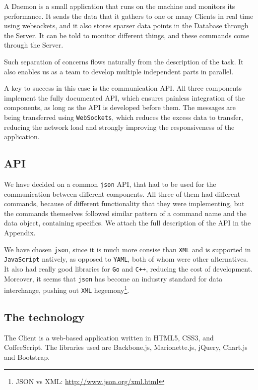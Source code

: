 \documentclass{l3proj}
\begin{document}
A Daemon is a small application that runs on the machine and monitors its performance. It sends the data that it gathers to one or many Clients in real time using websockets, and it also stores sparser data points in the Database through the Server. It can be told to monitor different things, and these commands come through the Server.

Such separation of concerns flows naturally from the description of the task. It also enables us as a team to develop multiple independent parts in parallel.

A key to success in this case is the communication API. All three components implement the fully documented API, which ensures painless integration of the components, as long as the API is developed before them. The messages are being transferred using \texttt{WebSockets}, which reduces the excess data to transfer, reducing the network load and strongly improving the responsiveness of the application.

\subsection{API}

We have decided on a common \texttt{json} API, that had to be used for the communication between different components. All three of them had different commands, because of different functionality that they were implementing, but the commands themselves followed similar pattern of a command name and the data object, containing specifics. We attach the full description of the API in the Appendix. 

We have chosen \texttt{json}, since it is much more consise than \texttt{XML} and is supported in \texttt{JavaScript} natively, as opposed to \texttt{YAML}, both of whom were other alternatives. It also had really good libraries for \texttt{Go} and \texttt{C++}, reducing the cost of development. Moreover, it seems that \texttt{json} has become an industry standard for data interchange, pushing out \texttt{XML} hegemony\footnote{\raggedright{}JSON vs XML: \url{http://www.json.org/xml.html}}. 

\subsection{The technology}

The Client is a web-based application written in HTML5, CSS3, and CoffeeScript. The libraries used are Backbone.js, Marionette.js, jQuery, Chart.js and Bootstrap.
\end{document}
